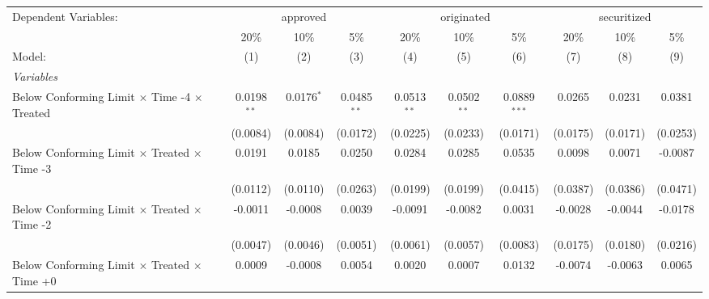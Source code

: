 \begingroup
\centering
\begin{tabular}{lccccccccc}
   \tabularnewline \midrule \midrule
   Dependent Variables: & \multicolumn{3}{c}{approved} & \multicolumn{3}{c}{originated} & \multicolumn{3}{c}{securitized}\\
                                                              & 20\%           & 10\%           & 5\%            & 20\%           & 10\%           & 5\%            & 20\%          & 10\%          & 5\% \\    
   Model:                                                     & (1)            & (2)            & (3)            & (4)            & (5)            & (6)            & (7)           & (8)           & (9)\\  
   \midrule
   \emph{Variables}\\
   Below Conforming Limit $\times$ Time -4 $\times$ Treated   & 0.0198$^{**}$  & 0.0176$^{*}$   & 0.0485$^{**}$  & 0.0513$^{**}$  & 0.0502$^{**}$  & 0.0889$^{***}$ & 0.0265        & 0.0231        & 0.0381\\   
                                                              & (0.0084)       & (0.0084)       & (0.0172)       & (0.0225)       & (0.0233)       & (0.0171)       & (0.0175)      & (0.0171)      & (0.0253)\\   
   Below Conforming Limit $\times$ Treated $\times$ Time -3   & 0.0191         & 0.0185         & 0.0250         & 0.0284         & 0.0285         & 0.0535         & 0.0098        & 0.0071        & -0.0087\\   
                                                              & (0.0112)       & (0.0110)       & (0.0263)       & (0.0199)       & (0.0199)       & (0.0415)       & (0.0387)      & (0.0386)      & (0.0471)\\   
   Below Conforming Limit $\times$ Treated $\times$ Time -2   & -0.0011        & -0.0008        & 0.0039         & -0.0091        & -0.0082        & 0.0031         & -0.0028       & -0.0044       & -0.0178\\   
                                                              & (0.0047)       & (0.0046)       & (0.0051)       & (0.0061)       & (0.0057)       & (0.0083)       & (0.0175)      & (0.0180)      & (0.0216)\\   
   Below Conforming Limit $\times$ Treated $\times$ Time +0   & 0.0009         & -0.0008        & 0.0054         & 0.0020         & 0.0007         & 0.0132         & -0.0074       & -0.0063       & 0.0065\\   

\end{tabular}

